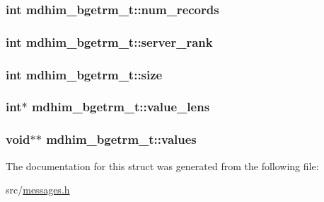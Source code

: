 \hypertarget{structmdhim__bgetrm__t_a3d398b31f450603e67b854ab563180e8}{
\subsubsection[{num\-\_\-records}]{\setlength{\rightskip}{0pt plus 5cm}int mdhim\-\_\-bgetrm\-\_\-t\-::num\-\_\-records}}\label{d0/d48/structmdhim__bgetrm__t_a3d398b31f450603e67b854ab563180e8}
\hypertarget{structmdhim__bgetrm__t_a3113667adc0eafe85d22c273766bce7f}{
\subsubsection[{server\-\_\-rank}]{\setlength{\rightskip}{0pt plus 5cm}int mdhim\-\_\-bgetrm\-\_\-t\-::server\-\_\-rank}}\label{d0/d48/structmdhim__bgetrm__t_a3113667adc0eafe85d22c273766bce7f}
\hypertarget{structmdhim__bgetrm__t_a18bb77da1f9fa807514b7449057157f4}{
\subsubsection[{size}]{\setlength{\rightskip}{0pt plus 5cm}int mdhim\-\_\-bgetrm\-\_\-t\-::size}}\label{d0/d48/structmdhim__bgetrm__t_a18bb77da1f9fa807514b7449057157f4}
\hypertarget{structmdhim__bgetrm__t_add99791a3bc82e16120388d1dc0f3ba7}{
\subsubsection[{value\-\_\-lens}]{\setlength{\rightskip}{0pt plus 5cm}int$\ast$ mdhim\-\_\-bgetrm\-\_\-t\-::value\-\_\-lens}}\label{d0/d48/structmdhim__bgetrm__t_add99791a3bc82e16120388d1dc0f3ba7}
\hypertarget{structmdhim__bgetrm__t_a322850d7fda46b0c170ca98342a81779}{
\subsubsection[{values}]{\setlength{\rightskip}{0pt plus 5cm}void$\ast$$\ast$ mdhim\-\_\-bgetrm\-\_\-t\-::values}}\label{d0/d48/structmdhim__bgetrm__t_a322850d7fda46b0c170ca98342a81779}


The documentation for this struct was generated from the following file\-:\begin{DoxyCompactItemize}
\item 
src/\hyperlink{messages_8h}{messages.\-h}\end{DoxyCompactItemize}
